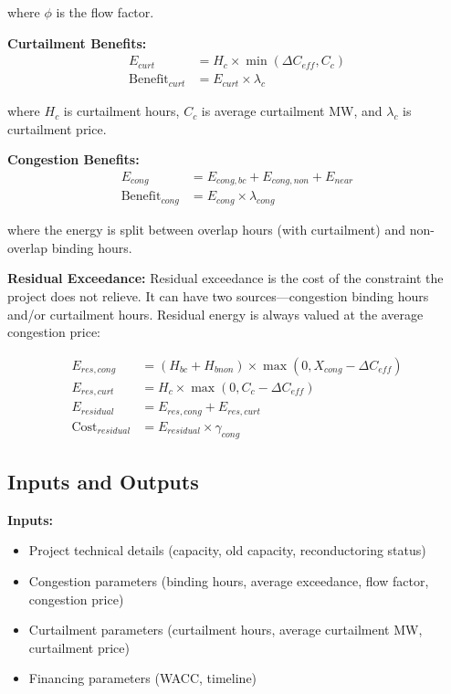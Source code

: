 \documentclass[ctcc_full_documentation.tex]{subfiles}
\begin{document}
where $\phi$ is the flow factor.

\textbf{Curtailment Benefits:}
\begin{align}
E_{curt} &= H_c \times \min(\Delta C_{eff}, C_c) \\
\text{Benefit}_{curt} &= E_{curt} \times \lambda_c
\end{align}

where $H_c$ is curtailment hours, $C_c$ is average curtailment MW, and $\lambda_c$ is curtailment price.

\textbf{Congestion Benefits:}
\begin{align}
E_{cong} &= E_{cong,bc} + E_{cong,non} + E_{near} \\
\text{Benefit}_{cong} &= E_{cong} \times \lambda_{cong}
\end{align}

where the energy is split between overlap hours (with curtailment) and non-overlap binding hours.

\textbf{Residual Exceedance:}
Residual exceedance is the cost of the constraint the project does not relieve. It can have two sources---congestion binding hours and/or curtailment hours. Residual energy is always valued at the average congestion price:

\begin{align}
E_{res,cong} &= (H_{bc} + H_{bnon}) \times \max(0, X_{cong} - \Delta C_{eff}) \\
E_{res,curt} &= H_c \times \max(0, C_c - \Delta C_{eff}) \\
E_{residual} &= E_{res,cong} + E_{res,curt} \\
\text{Cost}_{residual} &= E_{residual} \times \gamma_{cong}
\end{align}

\subsection{Inputs and Outputs}

\textbf{Inputs:}
\begin{itemize}
    \item Project technical details (capacity, old capacity, reconductoring status)
    \item Congestion parameters (binding hours, average exceedance, flow factor, congestion price)
    \item Curtailment parameters (curtailment hours, average curtailment MW, curtailment price)
    \item Financing parameters (WACC, timeline)
\end{itemize}
\end{document}
